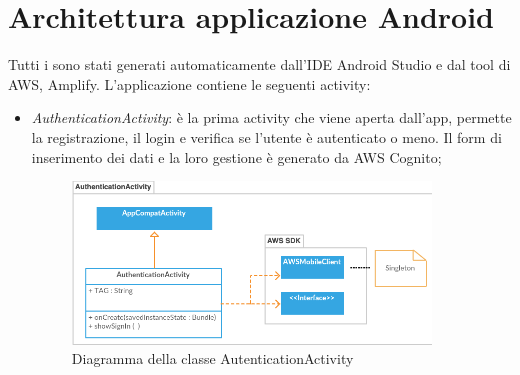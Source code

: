 \pagebreak
\section{Architettura applicazione Android}
Tutti i  sono stati generati automaticamente dall'IDE Android Studio e dal tool di AWS, Amplify. L'applicazione contiene le seguenti activity:

\begin{itemize}
    \item \emph{AuthenticationActivity}: è la prima activity che viene aperta dall'app, permette la registrazione, il login e verifica se l'utente è autenticato o meno. Il form di inserimento dei dati e la loro gestione è generato da AWS Cognito;
        \begin{figure}[H]
        \begin{center}
            \includegraphics[width=0.9\textwidth, keepaspectratio]{../includes/pics/authenticationactivity.png}
            \caption{Diagramma della classe AutenticationActivity}
        \end{center}
        \end{figure}


\end{itemize}
